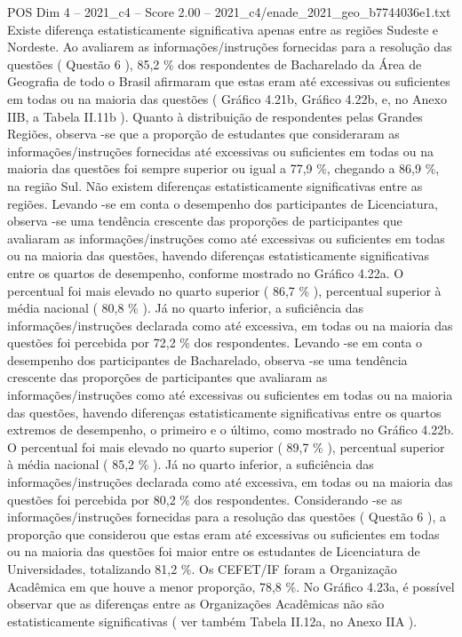 \begin{textsample}{POS Dim 4 – 2021\_c4 – Score 2.00 – 2021\_c4/enade\_2021\_geo\_b7744036e1.txt}
Existe diferença estatisticamente significativa apenas entre as regiões Sudeste e Nordeste.
Ao avaliarem as informações/instruções fornecidas para a resolução das questões ( Questão 6 ), 85,2 \% dos respondentes de Bacharelado da Área de Geografia de todo o Brasil afirmaram que estas eram até excessivas ou suficientes em todas ou na maioria das questões ( Gráfico 4.21b, Gráfico 4.22b, e, no Anexo IIB, a Tabela II.11b ).
Quanto à distribuição de respondentes pelas Grandes Regiões, observa -se que a proporção de estudantes que consideraram as informações/instruções fornecidas até excessivas ou suficientes em todas ou na maioria das questões foi sempre superior ou igual a 77,9 \%, chegando a 86,9 \%, na região Sul.
Não existem diferenças estatisticamente significativas entre as regiões.
Levando -se em conta o desempenho dos participantes de Licenciatura, observa -se uma tendência crescente das proporções de participantes que avaliaram as informações/instruções como até excessivas ou suficientes em todas ou na maioria das questões, havendo diferenças estatisticamente significativas entre os quartos de desempenho, conforme mostrado no Gráfico 4.22a.
O percentual foi mais elevado no quarto superior ( 86,7 \% ), percentual superior à média nacional ( 80,8 \% ).
Já no quarto inferior, a suficiência das informações/instruções declarada como até excessiva, em todas ou na maioria das questões foi percebida por 72,2 \% dos respondentes.
Levando -se em conta o desempenho dos participantes de Bacharelado, observa -se uma tendência crescente das proporções de participantes que avaliaram as informações/instruções como até excessivas ou suficientes em todas ou na maioria das questões, havendo diferenças estatisticamente significativas entre os quartos extremos de desempenho, o primeiro e o último, como mostrado no Gráfico 4.22b.
O percentual foi mais elevado no quarto superior ( 89,7 \% ), percentual superior à média nacional ( 85,2 \% ).
Já no quarto inferior, a suficiência das informações/instruções declarada como até excessiva, em todas ou na maioria das questões foi percebida por 80,2 \% dos respondentes.
Considerando -se as informações/instruções fornecidas para a resolução das questões ( Questão 6 ), a proporção que considerou que estas eram até excessivas ou suficientes em todas ou na maioria das questões foi maior entre os estudantes de Licenciatura de Universidades, totalizando 81,2 \%.
Os CEFET/IF foram a Organização Acadêmica em que houve a menor proporção, 78,8 \%.
No Gráfico 4.23a, é possível observar que as diferenças entre as Organizações Acadêmicas não são estatisticamente significativas ( ver também Tabela II.12a, no Anexo IIA ).

\end{textsample}
